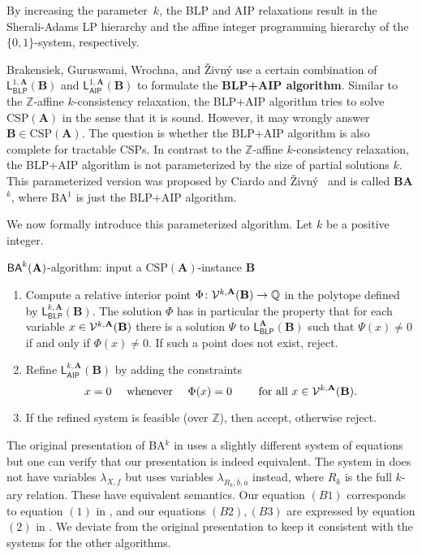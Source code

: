 \documentclass[a4paper,english, thm-restate]{lipics-v2021}
\newcommand{\ZZ}{\mathbb{Z}}
\newcommand{\QQ}{\mathbb{Q}}
\newcommand{\defining}[1]{\textbf{#1}}
\newcommand{\tup}[1]{\bar{#1}}
\newcommand{\StructA}{\mathbf{A}}
\newcommand{\StructB}{\mathbf{B}}
\newcommand{\CSP}[1]{\mathrm{CSP}(#1)}
\newcommand{\leqs}{\mathsf{L}}
\newcommand{\blk}[3]{\leqs^{#1,#2}_{\mathsf{BLP}} (#3)}
\newcommand{\aipk}[3]{\leqs^{#1,#2}_{\mathsf{AIP}} (#3)}
\newcommand{\blp}[2]{\leqs^#1_{\mathsf{BLP}} (#2)}
\begin{document}
	By increasing the parameter~$k$, 
	the BLP and AIP relaxations result in the Sherali-Adams LP hierarchy and
	the affine integer programming hierarchy of the $\{0,1\}$-system, respectively.
	
	Brakensiek, Guruswami, Wrochna, and Živný \cite{BrakensiekGWZ2020} use a certain combination of $\blk{1}{\StructA}{\StructB}$ and $\aipk{1}{\StructA}{\StructB}$
	to formulate the \defining{BLP+AIP algorithm}.
	Similar to the $\ZZ$-affine $k$-consistency relaxation,
	the BLP+AIP algorithm tries to solve $\CSP{\StructA}$
	in the sense that it is sound.
	However, it may wrongly answer $\StructB \in \CSP{\StructA}$.
	The question is whether the BLP+AIP algorithm is also complete for tractable CSPs.
	In contrast to the $\ZZ$-affine $k$-consistency relaxation,
	the BLP+AIP algorithm is not parameterized by the size of partial solutions $k$.
	This parameterized version was proposed by Ciardo and Živný~\cite{CiardoZivny2023Tensors, CiardoZivny2023BAk}
	and is called \defining{BA$^k$}, where BA$^1$ is just the BLP+AIP algorithm.
	
	We now formally introduce this parameterized algorithm.
	Let $k$ be a positive integer.
	
	\begin{algobox}{$\BAk{k}{\StructA}$-algorithm: input a $\CSP{\StructA}$-instance $\StructB$}
		\begin{enumerate}
			\item Compute a relative interior point $\Phi \colon \VarsIP{k}{\StructA}{\StructB} \to \QQ $ in the polytope defined by $\blk{k}{\StructA}{\StructB}$.
			The solution $\Phi$ has in particular the property that for each variable $x \in \VarsIP{k}{\StructA}{\StructB}$ there is a solution $\Psi$ to $\blp{\StructA}{\StructB}$ such that $\Psi(x) \neq 0$
			if and only if $\Phi(x) \neq 0$.
			If such a point does not exist, reject.\label{itm:bak-interior-point}
			\item \label{item:bak-refined-constr} Refine $\aipk{k}{\StructA}{\StructB}$ by adding the constraints
			\[x = 0 \quad \text { whenever } \quad \Phi(x) = 0 \qquad \text{ for all }{x\in \VarsIP{k}{\StructA}{\StructB}}.\] 
			\item If the refined system is feasible (over $\ZZ$), then accept, otherwise reject.
		\end{enumerate}	
	\end{algobox}
	\noindent The original presentation of BA$^k$ in \cite{CiardoZivny2023Tensors} uses a slightly different system of equations but
	 one can verify that our presentation is indeed equivalent. The system in \cite{CiardoZivny2023Tensors} does not have variables $\lambda_{X,f}$ but uses variables $\lambda_{R_k,\tup{b},\tup{a}}$ instead, where $R_k$ is the full $k$-ary relation. These have equivalent semantics. Our equation $(B1)$ corresponds to equation $(1)$ in \cite{CiardoZivny2023Tensors}, and our equations $(B2), (B3)$ are expressed by equation $(2)$ in \cite{CiardoZivny2023Tensors}. We deviate from the original presentation to keep it consistent with the systems for the other algorithms.
	
\end{document}
